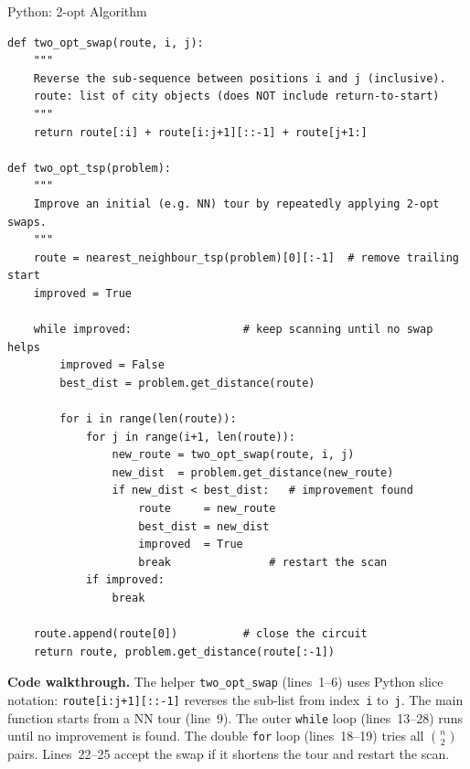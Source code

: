 \documentclass[aspectratio=169,10pt]{beamer}
\begin{document}
\begin{frame}[fragile]{Python: 2-opt Algorithm}

\begin{lstlisting}[caption={2-opt heuristic --- Python translation of book Listing 1.3}]
def two_opt_swap(route, i, j):
    """
    Reverse the sub-sequence between positions i and j (inclusive).
    route: list of city objects (does NOT include return-to-start)
    """
    return route[:i] + route[i:j+1][::-1] + route[j+1:]

def two_opt_tsp(problem):
    """
    Improve an initial (e.g. NN) tour by repeatedly applying 2-opt swaps.
    """
    route = nearest_neighbour_tsp(problem)[0][:-1]  # remove trailing start
    improved = True

    while improved:                 # keep scanning until no swap helps
        improved = False
        best_dist = problem.get_distance(route)

        for i in range(len(route)):
            for j in range(i+1, len(route)):
                new_route = two_opt_swap(route, i, j)
                new_dist  = problem.get_distance(new_route)
                if new_dist < best_dist:   # improvement found
                    route     = new_route
                    best_dist = new_dist
                    improved  = True
                    break               # restart the scan
            if improved:
                break

    route.append(route[0])          # close the circuit
    return route, problem.get_distance(route[:-1])
\end{lstlisting}

\textbf{Code walkthrough.}
The helper \texttt{two\_opt\_swap} (lines~1--6) uses Python slice
notation: \texttt{route[i:j+1][::-1]} reverses the sub-list from
index~\texttt{i} to~\texttt{j}.
The main function starts from a NN tour (line~9).
The outer \texttt{while} loop (lines~13--28) runs until no improvement
is found.  The double \texttt{for} loop (lines~18--19) tries all
$\binom{n}{2}$ pairs.  Lines~22--25 accept the swap if it shortens the
tour and restart the scan.

\end{frame}
\end{document}
